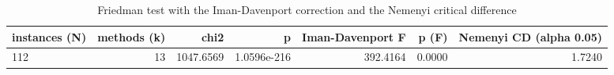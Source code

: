 \begin{table}[htbp]
\centering
\small
\caption{Friedman test with the Iman-Davenport correction and the Nemenyi critical difference}
\label{tab:E10a_state_of_the_art_b10_friedman_test}
\begin{tabular}{lrrrrrr}
\toprule
instances (N) & methods (k) & chi2 & p & Iman-Davenport F & p (F) & Nemenyi CD (alpha 0.05) \\
\midrule
112 & 13 & 1047.6569 & 1.0596e-216 & 392.4164 & 0.0000 & 1.7240 \\
\bottomrule
\end{tabular}
\end{table}
